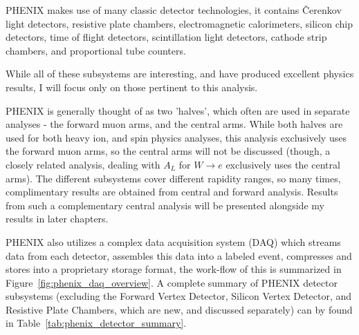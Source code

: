 PHENIX makes use of many classic detector technologies, it contains \v{C}erenkov
light detectors, resistive plate chambers, electromagnetic calorimeters, silicon
chip detectors, time of flight detectors, scintillation light detectors, cathode
strip chambers, and proportional tube counters.

While all of these subsystems are interesting, and have produced excellent
physics results, I will focus only on those pertinent to this analysis.

PHENIX is generally thought of as two 'halves', which often are used in separate
analyses - the forward muon arms, and the central arms. While both halves are
used for both heavy ion, and spin physics analyses, this analysis exclusively
uses the forward muon arms, so the central arms will not be discussed (though, a
closely related analysis, dealing with $A_L$ for $W\rightarrow e$ exclusively
uses the central arms). The different subsystems cover different rapidity
ranges, so many times, complimentary results are obtained from central and
forward analysis. Results from such a complementary central analysis will be
presented alongside my results in later chapters.

PHENIX also utilizes a complex data acquisition system (DAQ) which streams data
from each detector, assembles this data into a labeled event, compresses and
stores into a proprietary storage format, the work-flow of this is summarized in
Figure~\ref{fig:phenix_daq_overview}. A complete summary of PHENIX detector
subsystems (excluding the Forward Vertex Detector, Silicon Vertex Detector, and
Resistive Plate Chambers, which are new, and discussed separately) can by found
in Table~\ref{tab:phenix_detector_summary}.

